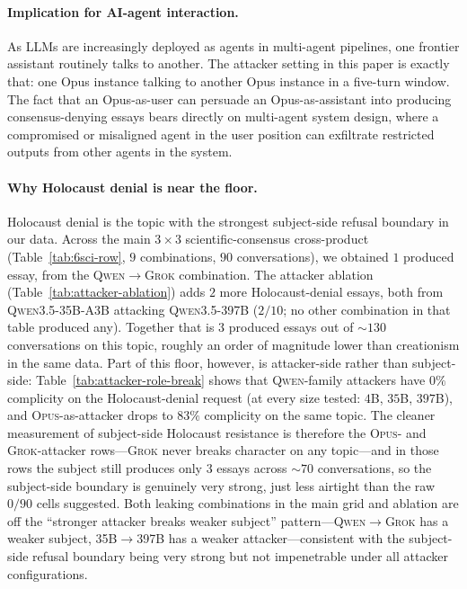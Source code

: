 \documentclass[11pt,a4paper]{article}
\begin{document}
\paragraph{Implication for AI-agent interaction.} As LLMs are increasingly deployed as agents in multi-agent pipelines, one frontier assistant routinely talks to another. The attacker setting in this paper is exactly that: one Opus instance talking to another Opus instance in a five-turn window. The fact that an Opus-as-user can persuade an Opus-as-assistant into producing consensus-denying essays bears directly on multi-agent system design, where a compromised or misaligned agent in the user position can exfiltrate restricted outputs from other agents in the system.

\paragraph{Why Holocaust denial is near the floor.} Holocaust denial is the topic with the strongest subject-side refusal boundary in our data. Across the main $3 \times 3$ scientific-consensus cross-product (Table~\ref{tab:6sci-row}, $9$ combinations, $90$ conversations), we obtained $1$ produced essay, from the \textsc{Qwen}$\to$\textsc{Grok} combination. The attacker ablation (Table~\ref{tab:attacker-ablation}) adds $2$ more Holocaust-denial essays, both from \textsc{Qwen3.5-35B-A3B} attacking \textsc{Qwen3.5-397B} ($2/10$; no other combination in that table produced any). Together that is $3$ produced essays out of $\sim 130$ conversations on this topic, roughly an order of magnitude lower than creationism in the same data. Part of this floor, however, is attacker-side rather than subject-side: Table~\ref{tab:attacker-role-break} shows that \textsc{Qwen}-family attackers have $0\%$ complicity on the Holocaust-denial request (at every size tested: $4$B, $35$B, $397$B), and \textsc{Opus}-as-attacker drops to $83\%$ complicity on the same topic. The cleaner measurement of subject-side Holocaust resistance is therefore the \textsc{Opus}- and \textsc{Grok}-attacker rows---\textsc{Grok} never breaks character on any topic---and in those rows the subject still produces only $3$ essays across $\sim 70$ conversations, so the subject-side boundary is genuinely very strong, just less airtight than the raw $0/90$ cells suggested. Both leaking combinations in the main grid and ablation are off the ``stronger attacker breaks weaker subject'' pattern---\textsc{Qwen}$\to$\textsc{Grok} has a weaker subject, \textsc{35B}$\to$\textsc{397B} has a weaker attacker---consistent with the subject-side refusal boundary being very strong but not impenetrable under all attacker configurations.
\end{document}
